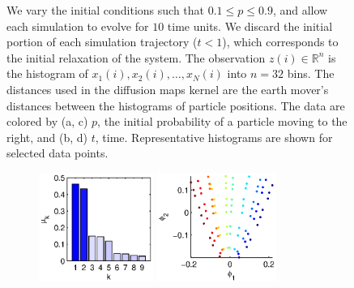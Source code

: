 \documentclass[preprint]{elsarticle}
\begin{document}
\begin{figure}[t!]
{%
We vary the initial conditions such that $0.1 \le p  \le 0.9$, and allow each simulation to evolve for $10$ time units.
%
We discard the initial portion of each simulation trajectory ($t < 1$), which corresponds to the initial relaxation of the system.
%
The observation $z(i) \in \mathbb{R}^n$ is the histogram of $x_1(i), x_2(i), \dots, x_N(i)$ into $n = 32$ bins.
%
The distances used in the diffusion maps kernel are the earth mover's distances between the histograms of particle positions. The data are colored by (a, c) $p$, the initial probability of a particle moving to the right, and (b, d) $t$, time. Representative histograms are shown for selected data points.}
\label{fig:dmaps_embed_emd}
\end{figure}

\begin{figure}
%
\def\figheight{1.4in}
%
\begin{subfigure}[t]{0.31\textwidth}
\centering
\includegraphics[height=\figheight]{chemotaxis1_evals}
\includegraphics[height=\figheight]{chemotaxis1_embed_good}

\end{subfigure}
\end{figure}
\end{document}
